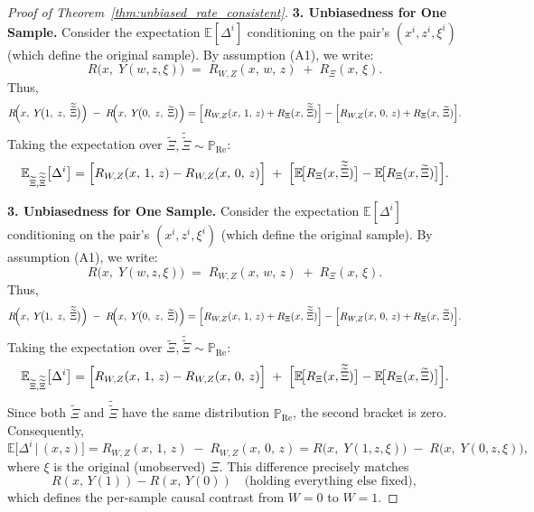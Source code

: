 \documentclass{article}
\theoremstyle{definition}
\begin{document}
\begin{proof}[Proof of Theorem~\ref{thm:unbiased_rate_consistent}]
    \textbf{3. Unbiasedness for One Sample.}
    Consider the expectation $\mathbb{E}[\Delta^i]$ conditioning on the pair's $(x^i,z^i,\xi^i)$ (which define the original sample). By assumption (A1), we write:
    \[
    R\!\bigl(x,\;Y(w,z,\xi)\bigr) \;=\; R_{W,Z}(x,\,w,\,z) \;+\; R_{\Xi}(x,\,\xi).
    \]
    Thus,
    \[
    R\!\Bigl(x,\;Y\!\bigl(1,\;z,\;\widetilde{\widetilde{\Xi}}\bigr)\Bigr) \;-\; R\!\Bigl(x,\;Y\!\bigl(0,\;z,\;\widetilde{\Xi}\bigr)\Bigr)
    =
    \Bigl[R_{W,Z}(x,\,1,\,z) + R_{\Xi}(x,\,\widetilde{\widetilde{\Xi}})\Bigr] - \Bigl[R_{W,Z}(x,\,0,\,z) + R_{\Xi}(x,\,\widetilde{\Xi})\Bigr].
    \]
    Taking the expectation over $\widetilde{\Xi}, \widetilde{\widetilde{\Xi}}\sim \mathbb{P}_{\mathrm{Re}}$:
    \[
    \mathbb{E}_{\widetilde{\Xi},\widetilde{\widetilde{\Xi}}}\bigl[\Delta^i\bigr]
    =
    \Bigl[R_{W,Z}(x,\,1,\,z) - R_{W,Z}(x,\,0,\,z)\Bigr] \;+\; \Bigl[\mathbb{E}\!\bigl[R_{\Xi}(x,\widetilde{\widetilde{\Xi}})\bigr] - \mathbb{E}\!\bigl[R_{\Xi}(x,\widetilde{\Xi})\bigr]\Bigr].
    \]
    
    \bigskip
    \textbf{3. Unbiasedness for One Sample.}
    Consider the expectation \(\mathbb{E}[\Delta^i]\) conditioning on the pair’s \((x^i,z^i,\xi^i)\) (which define the original sample). By assumption (A1), we write:
    \[
    R\!\bigl(x,\;Y(w,z,\xi)\bigr)
    \;=\;
    R_{W,Z}(x,\,w,\,z)
    \;+\;
    R_{\Xi}(x,\,\xi).
    \]
    Thus,
    \[
    R\!\Bigl(x,\;Y\!\bigl(1,\;z,\;\widetilde{\widetilde{\Xi}}\bigr)\Bigr)
    \;-\;
    R\!\Bigl(x,\;Y\!\bigl(0,\;z,\;\widetilde{\Xi}\bigr)\Bigr)
    =
    \Bigl[R_{W,Z}(x,\,1,\,z) + R_{\Xi}(x,\,\widetilde{\widetilde{\Xi}})\Bigr]
    -
    \Bigl[R_{W,Z}(x,\,0,\,z) + R_{\Xi}(x,\,\widetilde{\Xi})\Bigr].
    \]
    Taking the expectation over \(\widetilde{\Xi}, \widetilde{\widetilde{\Xi}}\sim \mathbb{P}_{\mathrm{Re}}\):
    \[
    \mathbb{E}_{\widetilde{\Xi},\widetilde{\widetilde{\Xi}}}\bigl[\Delta^i\bigr]
    =
    \Bigl[
    R_{W,Z}(x,\,1,\,z) - R_{W,Z}(x,\,0,\,z)
    \Bigr]
    \;+\;
    \Bigl[
    \mathbb{E}\!\bigl[R_{\Xi}(x,\widetilde{\widetilde{\Xi}})\bigr]
    - 
    \mathbb{E}\!\bigl[R_{\Xi}(x,\widetilde{\Xi})\bigr]
    \Bigr].
    \]
    Since both \(\widetilde{\Xi}\) and \(\widetilde{\widetilde{\Xi}}\) have the same distribution \(\mathbb{P}_{\mathrm{Re}}\), the second bracket is zero. Consequently,
    \[
    \mathbb{E}\bigl[\Delta^i \,\big|\,(x,z)\bigr]
    =
    R_{W,Z}(x,\,1,\,z) \;-\; R_{W,Z}(x,\,0,\,z)
    =
    R\!\bigl(x,\;Y(1,z,\xi)\bigr) \;-\; R\!\bigl(x,\;Y(0,z,\xi)\bigr),
    \]
    where \(\xi\) is the original (unobserved) \(\Xi\). This difference precisely matches
    \[
    R(x,\,Y(1)) - R(x,\,Y(0))
    \quad
    \text{(holding everything else fixed)},
    \]
    which defines the per-sample causal contrast from \(W=0\) to \(W=1\). 
    

\end{proof}
\end{document}
